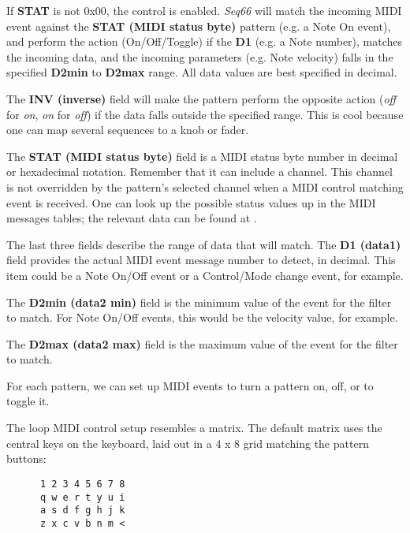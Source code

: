    If \textbf{STAT} is not 0x00, the control is enabled.  \textsl{Seq66} will
   match the incoming MIDI event against the \textbf{STAT (MIDI status byte)}
   pattern (e.g. a Note On event), and perform the action (On/Off/Toggle) if
   the \textbf{D1} (e.g. a Note number), matches the incoming data, and the
   incoming parameters (e.g. Note velocity) falls in the specified
   \textbf{D2min} to \textbf{D2max} range.  All data values are best specified
   in decimal.

   The \textbf{INV (inverse)} field will make the pattern perform the opposite
   action (\textsl{off} for \textsl{on}, \textsl{on} for \textsl{off}) if the
   data falls outside the specified range.  This is cool because one can map
   several sequences to a knob or fader.

   The \textbf{STAT (MIDI status byte)} field is a MIDI status byte number in
   decimal or hexadecimal notation.
   Remember that it can include a channel.  This channel is not overridden by
   the pattern's selected channel when a MIDI control matching event is
   received. 
   One can look up the possible status values up in the MIDI messages tables;
   the relevant data can be found at \cite{midicontroltable}.

   The last three fields describe the range of data that will match.  The
   \textbf{D1 (data1)} field provides the actual MIDI event message number to
   detect, in decimal.  This item could be a Note On/Off event or a
   Control/Mode change event, for example.

   The \textbf{D2min (data2 min)} field is the minimum value of the event for
   the filter to match. For Note On/Off events, this would be the velocity
   value, for example.

   The \textbf{D2max (data2 max)} field is the maximum value of the event for
   the filter to match.


   For each pattern, we can set up MIDI events to turn a 
   pattern on, off, or to toggle it.

   The loop MIDI control setup resembles a matrix.  The default matrix
   uses the central keys on the keyboard, laid out in a 4 x 8 grid matching the
   pattern buttons:

   \begin{verbatim}
      1 2 3 4 5 6 7 8
      q w e r t y u i
      a s d f g h j k
      z x c v b n m <
   \end{verbatim}

